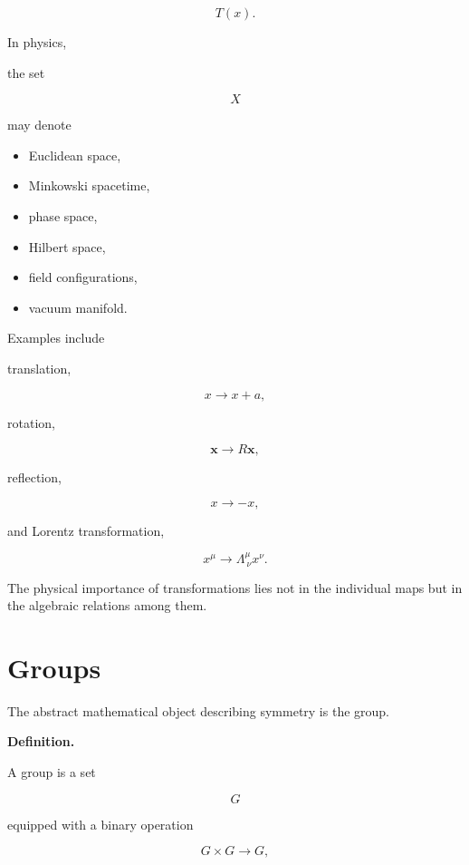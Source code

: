 \[
T(x).
\]

In physics,

the set

\[
X
\]

may denote

\begin{itemize}

\item Euclidean space,

\item Minkowski spacetime,

\item phase space,

\item Hilbert space,

\item field configurations,

\item vacuum manifold.

\end{itemize}

Examples include

translation,

\[
x
\rightarrow
x+a,
\]

rotation,

\[
\mathbf x
\rightarrow
R\mathbf x,
\]

reflection,

\[
x
\rightarrow
-x,
\]

and Lorentz transformation,

\[
x^\mu
\rightarrow
\Lambda^\mu_{\ \nu}
x^\nu.
\]

The physical importance of transformations lies not in the individual
maps but in the algebraic relations among them.


\section{Groups}

The abstract mathematical object describing symmetry is the group.

\bigskip

\textbf{Definition.}

A group is a set

\[
G
\]

equipped with a binary operation

\[
G\times G
\rightarrow
G,
\]

